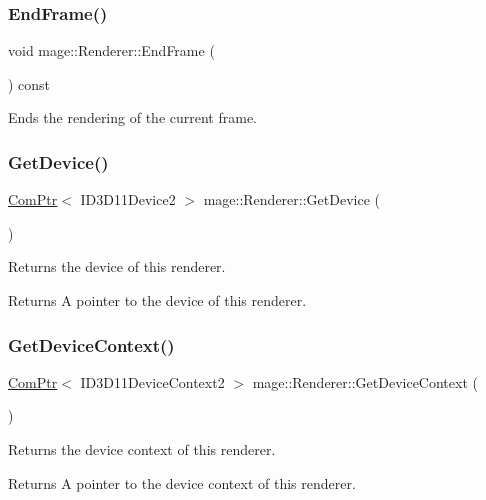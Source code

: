 \subsubsection{\texorpdfstring{End\+Frame()}{EndFrame()}}
{\footnotesize\ttfamily void mage\+::\+Renderer\+::\+End\+Frame (\begin{DoxyParamCaption}{ }\end{DoxyParamCaption}) const}

Ends the rendering of the current frame. \hypertarget{classmage_1_1_renderer_a872e88f421405b06a995a6fb231d59ec}{}\label{classmage_1_1_renderer_a872e88f421405b06a995a6fb231d59ec} 
\subsubsection{\texorpdfstring{Get\+Device()}{GetDevice()}}
{\footnotesize\ttfamily \hyperlink{namespacemage_ae74f374780900893caa5555d1031fd79}{Com\+Ptr}$<$ I\+D3\+D11\+Device2 $>$ mage\+::\+Renderer\+::\+Get\+Device (\begin{DoxyParamCaption}{ }\end{DoxyParamCaption})}

Returns the device of this renderer.

\begin{DoxyReturn}{Returns}
A pointer to the device of this renderer. 
\end{DoxyReturn}
\hypertarget{classmage_1_1_renderer_a9c0c9254fb8295e415c80fff8de99f82}{}\label{classmage_1_1_renderer_a9c0c9254fb8295e415c80fff8de99f82} 
\subsubsection{\texorpdfstring{Get\+Device\+Context()}{GetDeviceContext()}}
{\footnotesize\ttfamily \hyperlink{namespacemage_ae74f374780900893caa5555d1031fd79}{Com\+Ptr}$<$ I\+D3\+D11\+Device\+Context2 $>$ mage\+::\+Renderer\+::\+Get\+Device\+Context (\begin{DoxyParamCaption}{ }\end{DoxyParamCaption})}

Returns the device context of this renderer.

\begin{DoxyReturn}{Returns}
A pointer to the device context of this renderer. 
\end{DoxyReturn}
\hypertarget{classmage_1_1_renderer_a11d47495a47c58a0f67aae3110f9f519}{}\label{classmage_1_1_renderer_a11d47495a47c58a0f67aae3110f9f519} 

